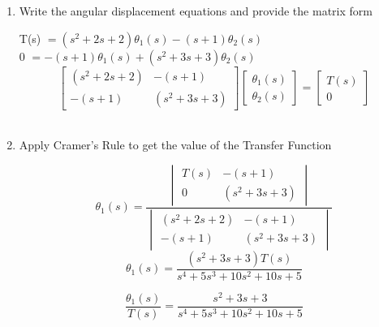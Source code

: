 \begin{fold}
\begin{enumerate}[label=(\alph*),itemindent=*, itemindent=*, leftmargin=*, nolistsep]
			\item Write the angular displacement equations and provide the matrix form
	\begin{center}
		T(s) $= (s^2 + 2s + 2)\theta_1(s) - (s+1)\theta_2(s)$\\
		0 $= -(s+1)\theta_1(s) + (s^2 + 3s + 3)\theta_2(s)$
		\[
			\begin{bmatrix}
			(s^2 + 2s + 2) & -(s+1)\\
			-(s+1) & (s^2 + 3s + 3)
			\end{bmatrix}
			\begin{bmatrix}
			\theta_1(s) \\
			\theta_2(s)
			\end{bmatrix}
			=
			\begin{bmatrix}
			T(s)\\
			0
			\end{bmatrix}
		\]\\
	\end{center}
			\item Apply Cramer's Rule to get the value of the Transfer Function
	\begin{center}
		\[
			\theta_1(s) = 
				\frac{\begin{vmatrix}
					T(s) & -(s+1)\\
					0 & (s^2 + 3s + 3)
				\end{vmatrix}
			}{\begin{vmatrix}
					(s^2 + 2s + 2) & -(s+1)\\
					-(s+1) & (s^2 + 3s + 3)
				\end{vmatrix}
			}
		\]
		\[
		\theta_1(s) = \frac{(s^2 + 3s + 3)T(s)}{s^4 + 5s^3 + 10s^2 + 10s + 5}
		\] 

		\[
		\boxed{\frac{\theta_1(s)}{T(s)} = \frac{s^2 + 3s + 3}{s^4 + 5s^3 + 10s^2 + 10s + 5}}
		\]
	\end{center}

\end{enumerate}

\end{fold}

